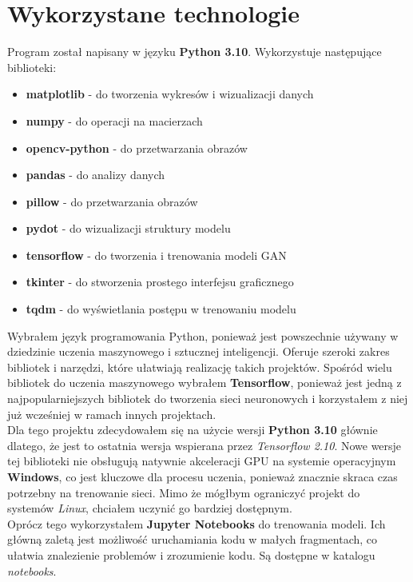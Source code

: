 \documentclass{article}
\begin{document}
\section{Wykorzystane technologie}
Program został napisany w języku \textbf{Python 3.10}. Wykorzystuje następujące biblioteki:
\begin{itemize}
    \setlength\itemsep{0pt}
    \item \textbf{matplotlib} - do tworzenia wykresów i wizualizacji danych
    \item \textbf{numpy} - do operacji na macierzach
    \item \textbf{opencv-python} - do przetwarzania obrazów
    \item \textbf{pandas} - do analizy danych
    \item \textbf{pillow} - do przetwarzania obrazów
    \item \textbf{pydot} - do wizualizacji struktury modelu
    \item \textbf{tensorflow} - do tworzenia i trenowania modeli GAN
    \item \textbf{tkinter} - do stworzenia prostego interfejsu graficznego
    \item \textbf{tqdm} - do wyświetlania postępu w trenowaniu modelu
\end{itemize}
Wybrałem język programowania Python, ponieważ jest powszechnie używany w dziedzinie uczenia maszynowego i sztucznej inteligencji. Oferuje szeroki zakres bibliotek i narzędzi, które ułatwiają realizację takich projektów. Spośród wielu bibliotek do uczenia maszynowego wybrałem \textbf{Tensorflow}, ponieważ jest jedną z najpopularniejszych bibliotek do tworzenia sieci neuronowych i korzystałem z niej już wcześniej w ramach innych projektach.
\vspace{3mm} \\
Dla tego projektu zdecydowałem się na użycie wersji \textbf{Python 3.10} głównie dlatego, że jest to ostatnia wersja wspierana przez \textit{Tensorflow 2.10}. Nowe wersje tej biblioteki nie obsługują natywnie akceleracji GPU na systemie operacyjnym \textbf{Windows}, co jest kluczowe dla procesu uczenia, ponieważ znacznie skraca czas potrzebny na trenowanie sieci. Mimo że mógłbym ograniczyć projekt do systemów \textit{Linux}, chciałem uczynić go bardziej dostępnym.
\vspace{3mm} \\
Oprócz tego wykorzystałem \textbf{Jupyter Notebooks} do trenowania modeli. Ich główną zaletą jest możliwość uruchamiania kodu w małych fragmentach, co ułatwia znalezienie problemów i zrozumienie kodu. Są dostępne w katalogu \textit{notebooks}.
\end{document}
